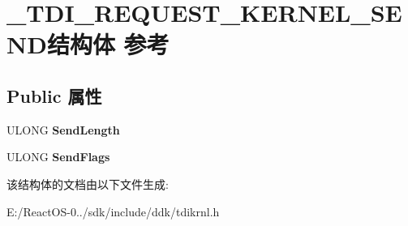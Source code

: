 \hypertarget{struct___t_d_i___r_e_q_u_e_s_t___k_e_r_n_e_l___s_e_n_d}{}\section{\+\_\+\+T\+D\+I\+\_\+\+R\+E\+Q\+U\+E\+S\+T\+\_\+\+K\+E\+R\+N\+E\+L\+\_\+\+S\+E\+N\+D结构体 参考}
\label{struct___t_d_i___r_e_q_u_e_s_t___k_e_r_n_e_l___s_e_n_d}
\subsection*{Public 属性}
\begin{DoxyCompactItemize}
\item 
\mbox{\label{struct___t_d_i___r_e_q_u_e_s_t___k_e_r_n_e_l___s_e_n_d_a592a7ed8a127970e350b302c78ab9fc7}} 
U\+L\+O\+NG {\bfseries Send\+Length}
\item 
\mbox{\label{struct___t_d_i___r_e_q_u_e_s_t___k_e_r_n_e_l___s_e_n_d_aec656700f5b11a683a6948d12b00b475}} 
U\+L\+O\+NG {\bfseries Send\+Flags}
\end{DoxyCompactItemize}


该结构体的文档由以下文件生成\+:\begin{DoxyCompactItemize}
\item 
E\+:/\+React\+O\+S-\/0../sdk/include/ddk/tdikrnl.\+h\end{DoxyCompactItemize}
